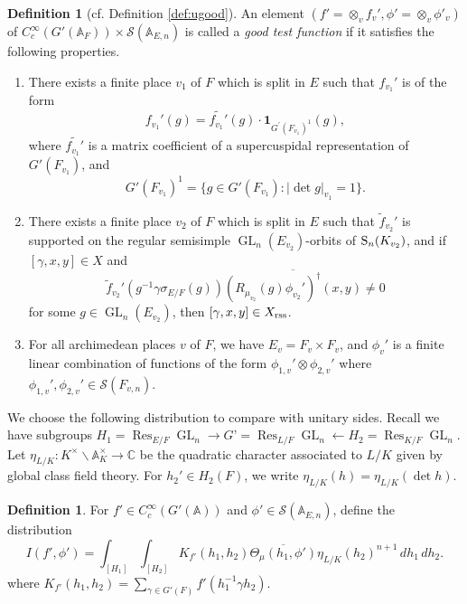 \documentclass[11pt, reqno]{amsart}
\numberwithin{equation}{subsection}
\theoremstyle{plain}
\theoremstyle{definition}
\newtheorem{definition}[proposition]{Definition}
\newcommand{\BA}{\mathbb A}
\newcommand{\BC}{\mathbb C}
\renewcommand{\AA}{\mathbb A}
\newcommand{\ol}{\overline}
\renewcommand{\S}{\textnormal{S}}
\newcommand{\cS}{\mathcal S}
\DeclareMathOperator{\GL}{GL}
\DeclareMathOperator{\Res}{Res}
\newcommand{\rss}{\textnormal{rss}}
\begin{document}
\begin{definition}[cf. Definition \ref{def:ugood}]
\label{def:glgood}
An element $(f' = \otimes_v f_v', \phi' = \otimes_v \phi'_v)$
of $C_c^\infty(G'(\AA_F)) \times \cS(\AA_{E,n})$ is
called a \emph{good test function} if it satisfies the 
following properties.
\begin{enumerate}[(1)]
\item \label{glmatrixcoeff}
There exists a finite place $v_1$ of
$F$ which is split in $E$ such that $f_{v_1}'$ is of
the form
\[
    f_{v_1}'(g) = \widetilde{f_{v_1}'}(g) 
    \cdot \mathbf{1}_{G^{\prime}(F_{v_1})^1}(g),
\]
where $\widetilde{f_{v_1}'}$ is a matrix coefficient of a
supercuspidal representation of $G'(F_{v_1})$, and
\[
    G'(F_{v_1})^1 = \{g \in G'(F_{v_1}) : \lvert \det g \rvert_{v_1} = 1 \}.
\]
\item \label{glrsssupp} 
There exists a finite
place $v_2$ of $F$ which is split in $E$ such that
$\widetilde f_{v_2}'$ is supported on the regular
semisimple $\GL_n(E_{v_2})$-orbits of $\S_n(K_{v_2})$,
and if $[\gamma, x, y] \in X$ and
\[
    \widetilde f_{v_2}'(g^{-1}\gamma \sigma_{E/F}(g))
    \ol{(R_{\mu_{v_2}}(g)\phi_{v_2}')^\dagger(x, y)} \neq 0
\]
for some $g \in \GL_n(E_{v_2})$, then $[\gamma, x, y] \in X_\rss$.

\item \label{glarch}
For all archimedean places $v$ of $F$, we have
$E_v = F_v \times F_v$, and $\phi_v'$ is a finite 
linear combination of functions of the form 
$\phi_{1,v}' \otimes \phi_{2,v}'$ where
$\phi_{1,v}', \phi_{2,v}' \in \cS(F_{v,n})$.
\end{enumerate}
\end{definition}


We choose the following
distribution to compare with unitary sides. Recall we have subgroups
$H_1=\Res_{E/F} \GL_n \to G’=\Res_{L/F} \GL_n \leftarrow H_2=\Res_{K/F} \GL_n.$ Let $\eta_{L/K} : K^\times \backslash \BA_K^\times \to \BC$ be the quadratic character associated to $L/K$ given by global class field theory. For $h_2' \in H_2(F)$, we write $\eta_{L/K}(h)=\eta_{L/K}(\det h)$.


\begin{definition}
For $f' \in C_c^\infty(G'(\AA))$ and $\phi' \in
\cS(\AA_{E,n})$, define the distribution
\begin{equation}
   I(f', \phi') =
    \int_{[H_1]}\int_{[H_2]} K_{f'}(h_1, h_2) \ol{\Theta_\mu(h_1, \phi')}\eta_{L/K}(h_2)^{n+1}\, dh_1\,dh_2. 
\end{equation}
where 
$K_{f'}(h_1, h_2) = \sum_{\gamma \in G'(F)} f'(h_1^{-1} \gamma h_2).$
\end{definition}
\end{document}
